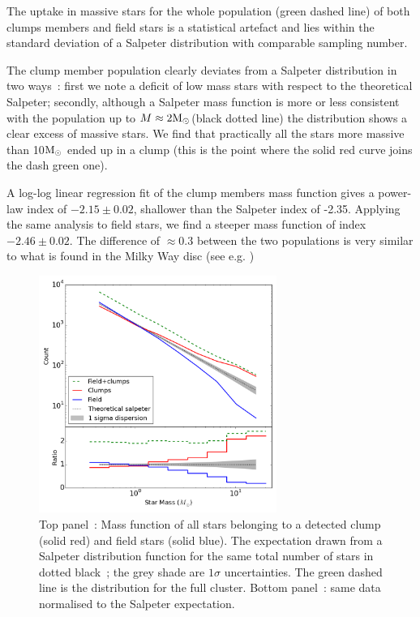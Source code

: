 The uptake  in massive stars for the whole population (green dashed line) of both clumps members and field stars is a statistical artefact and lies within the standard deviation of a Salpeter distribution with comparable sampling number. 

The clump member population clearly deviates from a Salpeter distribution in two ways~: first we note a deficit of low mass stars with respect to the theoretical Salpeter; secondly, although a Salpeter mass function is more or less consistent with the population up to $M\approx 2{\textrm{M}_\odot}$(black dotted line) the distribution shows a clear excess of massive stars. We find that practically all the stars more massive than 10${\textrm{M}_\odot}$ ended up in a clump (this is the point where the solid red curve joins the dash green one). 

A log-log linear regression fit of the clump members mass function gives a power-law index of $-2.15 \pm 0.02$, shallower than the Salpeter index of -2.35. Applying the same analysis to field stars,  we find a steeper mass function of index $-2.46 \pm 0.02$. The difference of $\approx 0.3 $ between the two populations is very similar to what is found in the Milky Way disc (see e.g. \citealt{Czekaj2014,Rybizki2015,Bastian2010} )

\begin{figure}
\begin{center}
\includegraphics[width=0.69\textwidth]{Figures/2_ClumpMembers}
\caption[Clump member and field stars mass functions]{Top panel~: Mass function of all stars belonging to a detected clump (solid red) and field stars (solid blue). The expectation drawn from a Salpeter distribution function for the same total number of stars in dotted black~; the grey shade are $1\sigma$ uncertainties. The green dashed line is the  distribution for the full cluster. Bottom panel~:  same data normalised to the Salpeter expectation.}
\label{Fig:2_ClumpMembers}
\end{center}
\end{figure}


